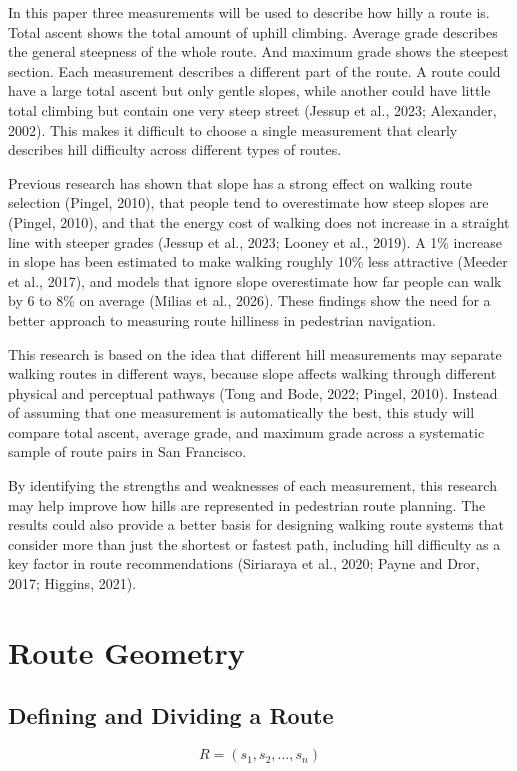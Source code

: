\documentclass[11pt,letterpaper]{article}
\begin{document}
In this paper three measurements will be used to describe how hilly a route is. Total ascent shows the total amount of uphill climbing. Average grade describes the general steepness of the whole route. And maximum grade shows the steepest section. Each measurement describes a different part of the route. A route could have a large total ascent but only gentle slopes, while another could have little total climbing but contain one very steep street (Jessup et al., 2023; Alexander, 2002). This makes it difficult to choose a single measurement that clearly describes hill difficulty across different types of routes.

Previous research has shown that slope has a strong effect on walking route selection (Pingel, 2010), that people tend to overestimate how steep slopes are (Pingel, 2010), and that the energy cost of walking does not increase in a straight line with steeper grades (Jessup et al., 2023; Looney et al., 2019). A 1\% increase in slope has been estimated to make walking roughly 10\% less attractive (Meeder et al., 2017), and models that ignore slope overestimate how far people can walk by 6 to 8\% on average (Milias et al., 2026). These findings show the need for a better approach to measuring route hilliness in pedestrian navigation.

This research is based on the idea that different hill measurements may separate walking routes in different ways, because slope affects walking through different physical and perceptual pathways (Tong and Bode, 2022; Pingel, 2010). Instead of assuming that one measurement is automatically the best, this study will compare total ascent, average grade, and maximum grade across a systematic sample of route pairs in San Francisco.

By identifying the strengths and weaknesses of each measurement, this research may help improve how hills are represented in pedestrian route planning. The results could also provide a better basis for designing walking route systems that consider more than just the shortest or fastest path, including hill difficulty as a key factor in route recommendations (Siriaraya et al., 2020; Payne and Dror, 2017; Higgins, 2021).

\section{Route Geometry}

\subsection{Defining and Dividing a Route}
\begin{equation}
\boxed{R=(s_1,s_2,\ldots,s_n)}
\end{equation}
\end{document}
